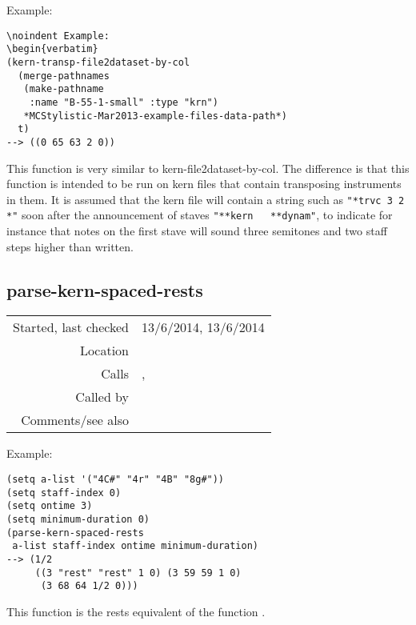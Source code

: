 \vspace{0.5cm}
\noindent Example:
\begin{verbatim}
\noindent Example:
\begin{verbatim}
(kern-transp-file2dataset-by-col
  (merge-pathnames
   (make-pathname
    :name "B-55-1-small" :type "krn")
   *MCStylistic-Mar2013-example-files-data-path*)
  t)
--> ((0 65 63 2 0))
\end{verbatim}

\noindent This function is very similar to
kern-file2dataset-by-col. The difference is that this
function is intended to be run on kern files that
contain transposing instruments in them. It is assumed
that the kern file will contain a string such as
\verb+"*trvc 3 2	*"+ soon after the
announcement of staves
\verb+"**kern	**dynam"+, to indicate for
instance that notes on the first stave will sound
three semitones and two staff steps higher than
written.


\subsection*{parse-kern-spaced-rests}\label{fun:parse-kern-spaced-rests}

\vspace{0.3cm}
\begin{tabular}{r|p{8cm}}
Started, last checked & 13/6/2014, 13/6/2014 \\
Location & \nameref{sec:kern-by-col} \\
Calls & \nameref{fun:kern-tie-dur-pitch2list},\newline \nameref{fun:pitch-and-octave2MIDI-morphetic-pair} \\
Called by & \nameref{fun:kern-col2rest-set} \\
Comments/see also & \nameref{fun:parse-kern-spaced-notes}
\end{tabular}

\vspace{0.5cm}
\noindent Example:
\begin{verbatim}
(setq a-list '("4C#" "4r" "4B" "8g#"))
(setq staff-index 0)
(setq ontime 3)
(setq minimum-duration 0)
(parse-kern-spaced-rests
 a-list staff-index ontime minimum-duration)
--> (1/2
     ((3 "rest" "rest" 1 0) (3 59 59 1 0)
      (3 68 64 1/2 0)))
\end{verbatim}

\noindent This function is the rests equivalent of
the function .























